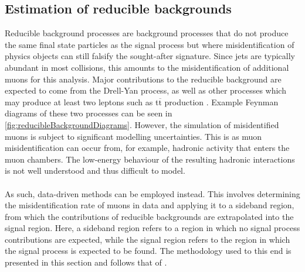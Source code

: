 \subsection{Estimation of reducible backgrounds}
\label{sec:ReducibleBackgrounds}
Reducible background processes are background processes that do not produce the same final state particles as the signal process but where misidentification of physics objects can still falsify the sought-after signature. Since jets are typically abundant in most collisions, this amounts to the misidentification of additional muons for this analysis. Major contributions to the reducible background are expected to come from the Drell-Yan process, as well as other processes which may produce at least two leptons such as t$\overline{\mathrm{t}}$ production \cite{StefThesis}. Example Feynman diagrams of these two processes can be seen in \autoref{fig:reducibleBackgroundDiagrams}. However, the simulation of misidentified muons is subject to significant modelling uncertainties. This is as muon misidentification can occur from, for example, hadronic activity that enters the muon chambers. The low-energy behaviour of the resulting hadronic interactions is not well understood and thus difficult to model. \\
\\
As such, data-driven methods can be employed instead. This involves determining the misidentification rate of muons in data and applying it to a sideband region, from which the contributions of reducible backgrounds are extrapolated into the signal region. Here, a sideband region refers to a region in which no signal process contributions are expected, while the signal region refers to the region in which the signal process is expected to be found. The methodology used to this end is presented in this section and follows that of \cite{HIG19-001}.
